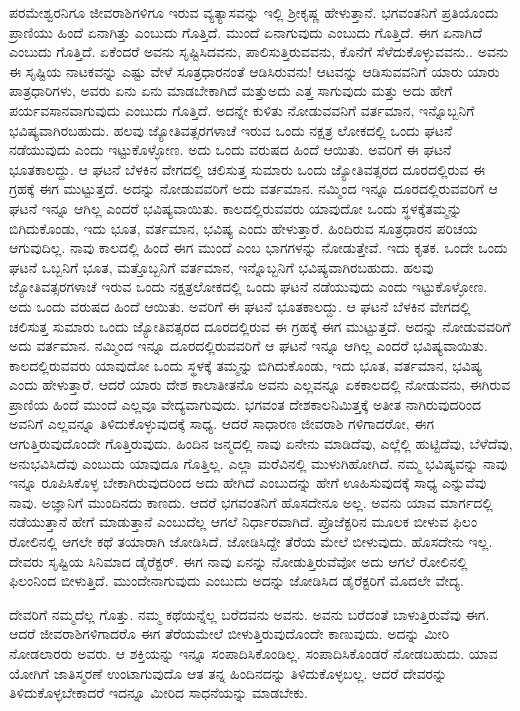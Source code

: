 ಪರಮೇಶ್ವರನಿಗೂ ಜೀವರಾಶಿಗಳಿಗೂ ಇರುವ ವ್ಯತ್ಯಾಸವನ್ನು ಇಲ್ಲಿ ಶ್ರೀಕೃಷ್ಣ ಹೇಳುತ್ತಾನೆ. ಭಗವಂತನಿಗೆ ಪ್ರತಿಯೊಂದು ಪ್ರಾಣಿಯು ಹಿಂದೆ ಏನಾಗಿತ್ತು ಎಂಬುದು ಗೊತ್ತಿದೆ. ಮುಂದೆ ಏನಾಗುವುದು ಎಂಬುದು ಗೊತ್ತಿದೆ. ಈಗ ಏನಾಗಿದೆ ಎಂಬುದು ಗೊತ್ತಿದೆ. ಏಕೆಂದರೆ ಅವನು ಸೃಷ್ಟಿಸಿದವನು, ಪಾಲಿಸುತ್ತಿರುವವನು, ಕೊನೆಗೆ ಸೆಳೆದುಕೊಳ್ಳುವವನು.. ಅವನು ಈ ಸೃಷ್ಟಿಯ ನಾಟಕವನ್ನು ಎಷ್ಟು ವೇಳೆ ಸೂತ್ರಧಾರನಂತೆ ಆಡಿಸಿರುವನು! ಆಟವನ್ನು ಆಡಿಸುವವನಿಗೆ ಯಾರು ಯಾರು ಪಾತ್ರಧಾರಿಗಳು, ಅವರು ಏನು ಏನು ಮಾಡಬೇಕಾಗಿದೆ ಮತ್ತುಅದು ಎತ್ತ ಸಾಗುವುದು ಮತ್ತು ಅದು ಹೇಗೆ ಪರ್ಯವಸಾನವಾಗುವುದು ಎಂಬುದು ಗೊತ್ತಿದೆ. ಅದನ್ನೇ ಕುಳಿತು ನೋಡುವವನಿಗೆ ವರ್ತಮಾನ, ಇನ್ನೊಬ್ಬನಿಗೆ ಭವಿಷ್ಯವಾಗಿರಬಹುದು. ಹಲವು ಜ್ಯೋತಿವತ್ಸರಗಳಾಚೆ ಇರುವ ಒಂದು ನಕ್ಷತ್ರ ಲೋಕದಲ್ಲಿ ಒಂದು ಘಟನೆ ನಡೆಯುವುದು ಎಂದು ಇಟ್ಟುಕೊಳ್ಳೋಣ. ಅದು ಒಂದು ವರುಷದ ಹಿಂದೆ ಆಯಿತು. ಅವರಿಗೆ ಈ ಘಟನೆ ಭೂತಕಾಲದ್ದು. ಆ ಘಟನೆ ಬೆಳಕಿನ ವೇಗದಲ್ಲಿ ಚಲಿಸುತ್ತ ಸುಮಾರು ಒಂದು ಜ್ಯೋತಿವತ್ಸರದ ದೂರದಲ್ಲಿರುವ ಈ ಗ್ರಹಕ್ಕೆ ಈಗ ಮುಟ್ಟುತ್ತದೆ. ಅದನ್ನು ನೋಡುವವರಿಗೆ ಅದು ವರ್ತಮಾನ. ನಮ್ಮಿಂದ ಇನ್ನೂ ದೂರದಲ್ಲಿರುವವರಿಗೆ ಆ ಘಟನೆ ಇನ್ನೂ ಆಗಿಲ್ಲ ಎಂದರೆ ಭವಿಷ್ಯವಾಯಿತು. ಕಾಲದಲ್ಲಿರುವವರು ಯಾವುದೋ ಒಂದು ಸ್ಥಳಕ್ಕೆತಮ್ಮನ್ನು ಬಿಗಿದುಕೊಂಡು, ಇದು ಭೂತ, ವರ್ತಮಾನ, ಭವಿಷ್ಯ ಎಂದು ಹೇಳುತ್ತಾರೆ. ಹಿಂದಿರುವ ಸೂತ್ರಧಾರನ ಪರಿಚಯ ಆಗುವುದಿಲ್ಲ. ನಾವು ಕಾಲದಲ್ಲಿ ಹಿಂದೆ ಈಗ ಮುಂದೆ ಎಂಬ ಭಾಗಗಳನ್ನು ನೋಡುತ್ತೇವೆ. ಇದು ಕೃತಕ. ಒಂದೇ ಒಂದು ಘಟನೆ ಒಬ್ಬನಿಗೆ ಭೂತ, ಮತ್ತೊಬ್ಬನಿಗೆ ವರ್ತಮಾನ, ಇನ್ನೊಬ್ಬನಿಗೆ ಭವಿಷ್ಯವಾಗಿರಬಹುದು. ಹಲವು ಜ್ಯೋತಿವತ್ಸರಗಳಾಚೆ ಇರುವ ಒಂದು ನಕ್ಷತ್ರಲೋಕದಲ್ಲಿ ಒಂದು ಘಟನೆ ನಡೆಯುವುದು ಎಂದು ಇಟ್ಟುಕೊಳ್ಳೋಣ. ಅದು ಒಂದು ವರುಷದ ಹಿಂದೆ ಆಯಿತು. ಅವರಿಗೆ ಈ ಘಟನೆ ಭೂತಕಾಲದ್ದು. ಆ ಘಟನೆ ಬೆಳಕಿನ ವೇಗದಲ್ಲಿ ಚಲಿಸುತ್ತ ಸುಮಾರು ಒಂದು ಜ್ಯೋತಿವತ್ಸರದ ದೂರದಲ್ಲಿರುವ ಈ ಗ್ರಹಕ್ಕೆ ಈಗ ಮುಟ್ಟುತ್ತದೆ. ಅದನ್ನು ನೋಡುವವರಿಗೆ ಅದು ವರ್ತಮಾನ. ನಮ್ಮಿಂದ ಇನ್ನೂ ದೂರದಲ್ಲಿರುವವರಿಗೆ ಆ ಘಟನೆ ಇನ್ನೂ ಆಗಿಲ್ಲ ಎಂದರೆ ಭವಿಷ್ಯವಾಯಿತು. ಕಾಲದಲ್ಲಿರುವವರು ಯಾವುದೋ ಒಂದು ಸ್ಥಳಕ್ಕೆ ತಮ್ಮನ್ನು ಬಿಗಿದುಕೊಂಡು, ಇದು ಭೂತ, ವರ್ತಮಾನ, ಭವಿಷ್ಯ ಎಂದು ಹೇಳುತ್ತಾರೆ. ಆದರೆ ಯಾರು ದೇಶ ಕಾಲಾತೀತನೊ ಅವನು ಎಲ್ಲವನ್ನೂ ಏಕಕಾಲದಲ್ಲಿ ನೋಡುವನು, ಈಗಿರುವ ಪ್ರಾಣಿಯ ಹಿಂದೆ ಮುಂದೆ ಎಲ್ಲವೂ ವೇದ್ಯವಾಗುವುದು. ಭಗವಂತ ದೇಶಕಾಲನಿಮಿತ್ತಕ್ಕೆ ಅತೀತ ನಾಗಿರುವುದರಿಂದ ಅವನಿಗೆ ಎಲ್ಲವನ್ನೂ ತಿಳಿದುಕೊಳ್ಳುವುದಕ್ಕೆ ಸಾಧ್ಯ. ಆದರೆ ಸಾಧಾರಣ ಜೀವರಾಶಿ ಗಳಿಗಾದರೋ, ಈಗ ಆಗುತ್ತಿರುವುದೊಂದೇ ಗೊತ್ತಿರುವುದು. ಹಿಂದಿನ ಜನ್ಮದಲ್ಲಿ ನಾವು ಏನೇನು ಮಾಡಿದೆವು, ಎಲ್ಲೆಲ್ಲಿ ಹುಟ್ಟಿದೆವು, ಬೆಳೆದೆವು, ಅನುಭವಿಸಿದೆವು ಎಂಬುದು ಯಾವುದೂ ಗೊತ್ತಿಲ್ಲ. ಎಲ್ಲಾ ಮರೆವಿನಲ್ಲಿ ಮುಳುಗಿಹೋಗಿದೆ. ನಮ್ಮ ಭವಿಷ್ಯವನ್ನು ನಾವು ಇನ್ನೂ ರೂಪಿಸಿಕೊಳ್ಳ ಬೇಕಾಗಿರುವುದರಿಂದ ಅದು ಹೇಗಿದೆ ಎಂಬುದನ್ನು ಹೇಗೆ ಊಹಿಸುವುದಕ್ಕೆ ಸಾಧ್ಯ ಎನ್ನುವೆವು ನಾವು. ಅಜ್ಞಾನಿಗೆ ಮುಂದಿನದು ಕಾಣದು. ಆದರೆ ಭಗವಂತನಿಗೆ ಹೊಸದೇನೂ ಅಲ್ಲ. ಅವನು ಯಾವ ಮಾರ್ಗದಲ್ಲಿ ನಡೆಯುತ್ತಾನೆ ಹೇಗೆ ಮಾಡುತ್ತಾನೆ ಎಂಬುದೆಲ್ಲ ಆಗಲೆ ನಿರ್ಧಾರವಾಗಿದೆ. ಪ್ರೊಜೆಕ್ಟರಿನ ಮೂಲಕ ಬೀಳುವ ಫಿಲಂ ರೋಲಿನಲ್ಲಿ ಆಗಲೇ ಕಥೆ ತಯಾರಾಗಿ ಜೋಡಿಸಿದೆ. ಜೋಡಿಸಿದ್ದೇ ತೆರೆಯ ಮೇಲೆ ಬೀಳುವುದು. ಹೊಸದೇನು ಇಲ್ಲ. ದೇವರು ಸೃಷ್ಟಿಯ ಸಿನಿಮಾದ ಡೈರೆಕ್ಟರ್. ಈಗ ನಾವು ಏನನ್ನು ನೋಡುತ್ತಿರುವೆವೋ ಅದು ಆಗಲೆ ರೋಲಿನಲ್ಲಿ ಫಿಲಂನಿಂದ ಬೀಳುತ್ತಿದೆ. ಮುಂದೇನಾಗುವುದು ಎಂಬುದು ಅದನ್ನು ಜೋಡಿಸಿದ ಡೈರೆಕ್ಟರಿಗೆ ಮೊದಲೇ ವೇದ್ಯ.

ದೇವರಿಗೆ ನಮ್ಮದೆಲ್ಲ ಗೊತ್ತು. ನಮ್ಮ ಕಥೆಯನ್ನೆಲ್ಲ ಬರೆದವನು ಅವನು. ಅವನು ಬರೆದಂತೆ ಬಾಳುತ್ತಿರುವೆವು ಈಗ. ಆದರೆ ಜೀವರಾಶಿಗಳಿಗಾದರೊ ಈಗ ತೆರೆಯಮೇಲೆ ಬೀಳುತ್ತಿರುವುದೊಂದೇ ಕಾಣುವುದು. ಅದನ್ನು ಮೀರಿ ನೋಡಲಾರರು ಅವರು. ಆ ಶಕ್ತಿಯನ್ನು ಇನ್ನೂ ಸಂಪಾದಿಸಿಕೊಂಡಿಲ್ಲ. ಸಂಪಾದಿಸಿಕೊಂಡರೆ ನೋಡಬಹುದು. ಯಾವ ಯೋಗಿಗೆ ಜಾತಿಸ್ಮರಣೆ ಉಂಟಾಗುವುದೊ ಆತ ತನ್ನ ಹಿಂದಿನದನ್ನು ತಿಳಿದುಕೊಳ್ಳಬಲ್ಲ. ಆದರೆ ದೇವರನ್ನು ತಿಳಿದುಕೊಳ್ಳಬೇಕಾದರೆ ಇದನ್ನೂ ಮೀರಿದ ಸಾಧನೆಯನ್ನು ಮಾಡಬೇಕು.

